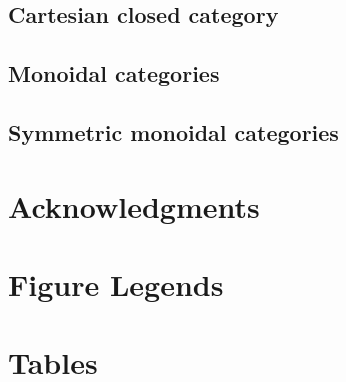 \subsection*{Cartesian closed category}

%
\subsection*{Monoidal categories}

%
\subsection*{Symmetric monoidal categories}


\section*{Acknowledgments}





\section*{Figure Legends}

\section*{Tables}



